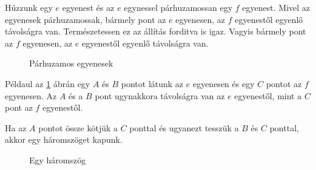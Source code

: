 \documentclass[11pt, a4paper]{article}
\begin{document}
H\'uzzunk egy $e$ egyenest \'es az $e$ egynessel p\'arhuzamossan egy $f$ egyenest. Mivel az egyenesek p\'arhuzamossak, b\'armely pont az $e$ egyenesen, az $f$ egyenest\H{o}l egyenl\H{o} t\'avols\'agra van. Term\'eszetessen ez az \'all\'it\'as forditva is igaz. Vagyis b\'armely pont az $f$ egyenesen, az $e$ egyenest\H{o}l egyenl\H{o} t\'avols\'agra van.

\begin{figure}[h]
\centering
{}
\caption{P\'arhuzamos egyenesek}
\label{fig:paralel}
\end{figure}
P\'eldaul az \ref{fig:paralel} \'abr\'an egy $A$ \'es $B$ pontot l\'atunk az $e$ egyenesen \'es egy $C$ pontot az $f$ egyenesen. Az $A$ \'es a $B$ pont ugynakkora t\'avols\'agra van az $e$ egyenest\H{o}l, mint a $C$ pont az $f$ egyenest\H{o}l.

Ha az $A$ pontot össze kötjük a $C$ ponttal \'es ugyanezt tesszük a $B$ \'es $C$ ponttal, akkor egy h\'aromszöget kapunk.

\begin{figure}[h]
\centering
{}
\caption{Egy h\'aromszög}
\label{fig:tri1}
\end{figure}
\end{document}
